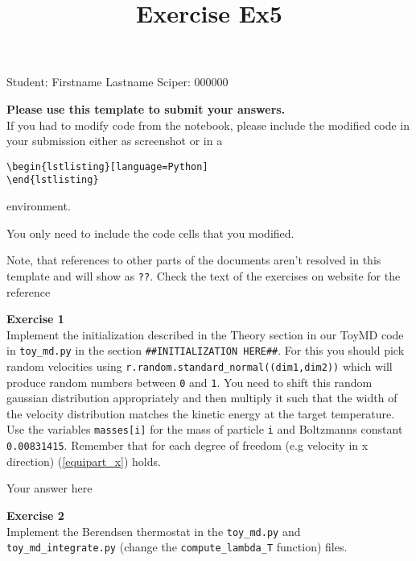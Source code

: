 \documentclass{article}
\title{Exercise Ex5}
\begin{document}
\maketitle\maketitle

Student:  Firstname Lastname    Sciper: 000000

\begin{mdframed}
\textbf{Please use this template to submit your answers.}\\
If you had to modify code from the notebook, please include the modified code in your submission either as screenshot or in a

\begin{verbatim}
\begin{lstlisting}[language=Python]
\end{lstlisting}
\end{verbatim}

environment.

You only need to include the code cells that you modified.

Note, that references to other parts of the documents aren't resolved in this template and will show as \texttt{??}. Check the text of the exercises on website for the reference
\end{mdframed}

\begin{mdframed}
\textbf{Exercise 1}\\
Implement the initialization described in the Theory section in our ToyMD code in \texttt{toy\_md.py} in the section \texttt{\#\#INITIALIZATION HERE\#\#}. For this you should pick random velocities using \texttt{r.random.standard\_normal((dim1,dim2))} which will produce random numbers between \texttt{0} and \texttt{1}. You need to shift this random gaussian distribution appropriately and then multiply it such that the width of the velocity distribution matches the kinetic energy at the target temperature. Use the variables \texttt{masses[i]} for the mass of particle \texttt{i} and Boltzmanns constant \texttt{0.00831415}. Remember that for each degree of freedom (e.g velocity in x direction) (\ref{equipart_x}) holds.
\end{mdframed}

Your answer here

\begin{mdframed}
\textbf{Exercise 2}\\
Implement the Berendsen thermostat in the \texttt{toy\_md.py} and \texttt{toy\_md\_integrate.py} (change the \texttt{compute\_lambda\_T} function) files.
\end{mdframed}
\end{document}
